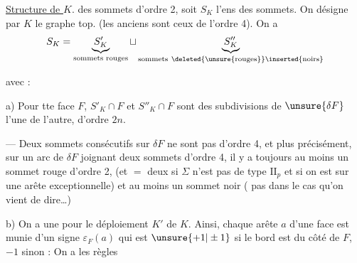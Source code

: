 \uline{Structure de \(K\)}.  des sommets d'ordre 2, soit \(S_K\) l'ens des sommets. On désigne par \(K\) le graphe top.  (les anciens sont ceux de l'ordre 4). On a
\[
S_K=\underbrace{S'_K}_{\text{sommets rouges}}\sqcup
\underbrace{S''_K}_{\substack{\text{sommets}\ \deleted{\text{\unsure{rouges}}}\inserted{\text{noirs}}}}
\]

avec :

a) Pour tte  face \(F\), \(S'_K\cap F\) et \(S''_K\cap F\) sont des subdivisions de \(\unsure{\delta F}\)  l'une de l'autre, d'ordre \(2n\).

 --- Deux sommets consécutifs sur \(\delta F\) ne sont pas d'ordre 4, et plus précisément,  sur un arc de \(\delta F\) joignant deux sommets d'ordre 4, il y a toujours au moins un sommet rouge d'ordre 2, (et $=$ deux si \(\Sigma\) n'est pas  de type \(\mathrm{II}_p\) et si on est sur une arête exceptionnelle) et au moins un sommet noir ( pas dans le cas qu'on vient de dire\dots)

b)  On a une  pour le déploiement \(K'\) de \(K\). Ainsi, chaque arête \(a\) d'une face  est munie d'un signe \(\varepsilon_F(a)\) qui est \(\unsure{+1|\pm1}\) si le bord est du côté de \(F\), \(-1\) sinon : On a les règles

